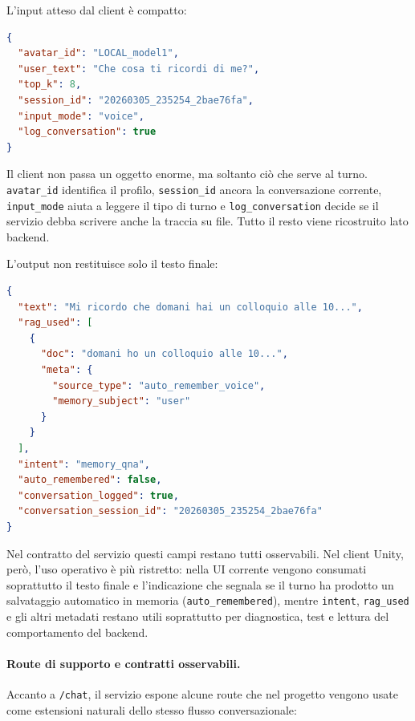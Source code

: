L'input atteso dal client è compatto:

\begin{lstlisting}[language=json,style=sfpayload,title={POST /chat},caption={Payload tipico della route \texttt{/chat}.}]
{
  "avatar_id": "LOCAL_model1",
  "user_text": "Che cosa ti ricordi di me?",
  "top_k": 8,
  "session_id": "20260305_235254_2bae76fa",
  "input_mode": "voice",
  "log_conversation": true
}
\end{lstlisting}

Il client non passa un oggetto enorme, ma soltanto ciò che serve al turno. \texttt{avatar\_id} identifica il profilo, \texttt{session\_id} ancora la conversazione corrente, \texttt{input\_mode} aiuta a leggere il tipo di turno e \texttt{log\_conversation} decide se il servizio debba scrivere anche la traccia su file. Tutto il resto viene ricostruito lato backend.

L'output non restituisce solo il testo finale:

\begin{lstlisting}[language=json,style=sfpayload,title={200 OK /chat},caption={Campi principali della risposta di \texttt{/chat}.}]
{
  "text": "Mi ricordo che domani hai un colloquio alle 10...",
  "rag_used": [
    {
      "doc": "domani ho un colloquio alle 10...",
      "meta": {
        "source_type": "auto_remember_voice",
        "memory_subject": "user"
      }
    }
  ],
  "intent": "memory_qna",
  "auto_remembered": false,
  "conversation_logged": true,
  "conversation_session_id": "20260305_235254_2bae76fa"
}
\end{lstlisting}

Nel contratto del servizio questi campi restano tutti osservabili. Nel client Unity, però, l'uso operativo è più ristretto: nella UI corrente vengono consumati soprattutto il testo finale e l'indicazione che segnala se il turno ha prodotto un salvataggio automatico in memoria (\texttt{auto\_remembered}), mentre \texttt{intent}, \texttt{rag\_used} e gli altri metadati restano utili soprattutto per diagnostica, test e lettura del comportamento del backend.

\paragraph{Route di supporto e contratti osservabili.}
Accanto a \texttt{/chat}, il servizio espone alcune route che nel progetto vengono usate come estensioni naturali dello stesso flusso conversazionale:

